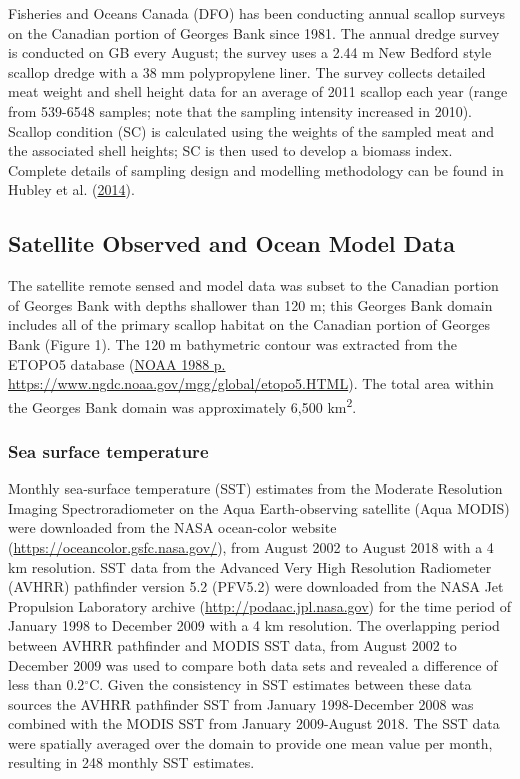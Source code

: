 \documentclass[
]{article}
\begin{document}
Fisheries and Oceans Canada (DFO) has been conducting annual scallop surveys on the Canadian portion of Georges Bank since 1981. The annual dredge survey is conducted on GB every August; the survey uses a 2.44 m New Bedford style scallop dredge with a 38 mm polypropylene liner. The survey collects detailed meat weight and shell height data for an average of 2011 scallop each year (range from 539-6548 samples; note that the sampling intensity increased in 2010). Scallop condition (SC) is calculated using the weights of the sampled meat and the associated shell heights; SC is then used to develop a biomass index. Complete details of sampling design and modelling methodology can be found in Hubley et al. (\protect\hyperlink{ref-hubleyGeorgesBankBrowns2014}{2014}).

\hypertarget{satellite-observed-and-ocean-model-data}{%
\subsection{Satellite Observed and Ocean Model Data}\label{satellite-observed-and-ocean-model-data}}

The satellite remote sensed and model data was subset to the Canadian portion of Georges Bank with depths shallower than 120 m; this Georges Bank domain includes all of the primary scallop habitat on the Canadian portion of Georges Bank (Figure 1). The 120 m bathymetric contour was extracted from the ETOPO5 database (\protect\hyperlink{ref-noaaDataAnnouncement88MGG021988}{NOAA 1988 p. https://www.ngdc.noaa.gov/mgg/global/etopo5.HTML}). The total area within the Georges Bank domain was approximately 6,500 km\textsuperscript{2}.

\hypertarget{sea-surface-temperature}{%
\subsubsection{Sea surface temperature}\label{sea-surface-temperature}}

Monthly sea-surface temperature (SST) estimates from the Moderate Resolution Imaging Spectroradiometer on the Aqua Earth-observing satellite (Aqua MODIS) were downloaded from the NASA ocean-color website (\url{https://oceancolor.gsfc.nasa.gov/}), from August 2002 to August 2018 with a 4 km resolution. SST data from the Advanced Very High Resolution Radiometer (AVHRR) pathfinder version 5.2 (PFV5.2) were downloaded from the NASA Jet Propulsion Laboratory archive (\url{http://podaac.jpl.nasa.gov}) for the time period of January 1998 to December 2009 with a 4 km resolution. The overlapping period between AVHRR pathfinder and MODIS SST data, from August 2002 to December 2009 was used to compare both data sets and revealed a difference of less than 0.2\(^{\circ}\)C. Given the consistency in SST estimates between these data sources the AVHRR pathfinder SST from January 1998-December 2008 was combined with the MODIS SST from January 2009-August 2018. The SST data were spatially averaged over the domain to provide one mean value per month, resulting in 248 monthly SST estimates.
\end{document}
